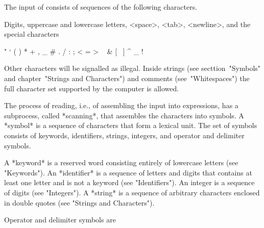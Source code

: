 
The input of {\GAP} consists of sequences of the following characters.

Digits, uppercase and lowercase letters, <space>, <tab>, <newline>, and
the special characters

\begintt
"    `    (    )    *    +    ,    _    #
.    /    :    ;    <    =    >    ~    &
[    \    ]    ^    _    {    }    ! 
\endtt

Other characters will be signalled as illegal.  Inside strings
(see secttion~"Symbols" and chapter~"Strings and Characters") and
comments (see~"Whitespaces") the full character set supported by
the computer is allowed.


The process of reading, i.e., of assembling the input into expressions,
has a subprocess, called *scanning*, that assembles the characters into
symbols.  A *symbol* is a sequence of characters that form a lexical
unit. The set of symbols consists of keywords, identifiers, strings,
integers, and operator and delimiter symbols.

A *keyword* is a reserved word consisting entirely of lowercase letters
(see "Keywords"). An *identifier* is a sequence of letters and digits that
contains at least one letter and is not a keyword (see "Identifiers").
An integer is a sequence of digits (see "Integers").  A *string* is a
sequence of  arbitrary characters  enclosed in double quotes (see
"Strings and Characters").

Operator and delimiter symbols are

